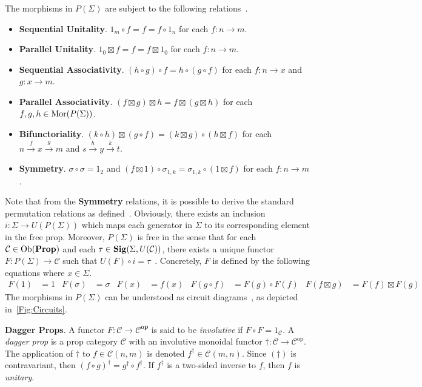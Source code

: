 The morphisms in $P( \Sigma )$ are subject to the following relations~\cite{Clement2023}.
\begin{itemize}
\item \textbf{Sequential Unitality}.
      $1_m \circ f = f = f \circ 1_n$ for each $f: n \to m$.
\item \textbf{Parallel Unitality}.
      $1_0 \boxtimes f = f = f \boxtimes 1_0$ for each $f: n \to m$.
\item \textbf{Sequential Associativity}.
      $( h \circ g ) \circ f = h \circ ( g \circ f )$ for each $f: n \to x$ and $g: x \to m$.
\item \textbf{Parallel Associativity}.
      $( f \boxtimes g ) \boxtimes h = f \boxtimes ( g \boxtimes h )$ for each $f, g, h \in \operatorname{Mor}( P( \Sigma ) )$.
\item \textbf{Bifunctoriality}.
      $( k \circ h ) \boxtimes ( g \circ f ) = ( k \boxtimes g ) \circ ( h \boxtimes f )$ for each $n \xrightarrow{f} x \xrightarrow{g} m$ and $s \xrightarrow{h} y \xrightarrow{k} t$. 
\item \textbf{Symmetry}.
      $\sigma \circ \sigma = 1_2$ and $( f \boxtimes 1 ) \circ \sigma_{1,k} = \sigma_{1,k} \circ ( 1 \boxtimes f )$ for each $f: n \to m$.
\end{itemize}
Note that from the \textbf{Symmetry} relations, it is possible to derive the standard permutation relations as defined~\cite{Lafont2003}.
Obviously, there exists an inclusion $i: \Sigma \to U( P( \Sigma ) )$ which maps each generator in $\Sigma$ to its corresponding element in the free prop.
Moreover, $P( \Sigma )$ is free in the sense that for each $\mathcal{C} \in \operatorname{Ob}( \mathbf{Prop} )$ and each $\tau \in \mathbf{Sig}( \Sigma, U( \mathcal{C} ) )$, there exists a unique functor $F: P( \Sigma ) \to \mathcal{C}$ such that $U( F ) \circ i = \tau$~\cite{Clerc2015}.
Concretely, $F$ is defined by the following equations where $x \in \Sigma$.
\begin{align*}
    F( 1 ) &= 1
    &
    F( \sigma ) &= \sigma
    &
    F( x ) &= f( x )
    &
    F( g \circ f ) &= F( g ) \circ F( f )
    &
    F( f \boxtimes g ) &= F( f ) \boxtimes F( g )
\end{align*}
The morphisms in $P( \Sigma )$ can be understood as circuit diagrams~\cite{Hotz1965}, as depicted in~\cref{Fig:Circuits}.

\vspace{1em}
\noindent
\textbf{Dagger Props}.
%
A functor $F: \mathcal{C} \to \mathcal{C}^\textbf{op}$ is said to be \emph{involutive} if $F \circ F = 1_{\mathcal{C}}$.
A \emph{dagger prop} is a prop category $\mathcal{C}$ with an involutive monoidal functor $\dagger: \mathcal{C} \to \mathcal{C}^{\text{op}}$.
The application of $\dagger$ to $f \in \mathcal{C}( n, m )$ is denoted $f^\dagger \in \mathcal{C}( m, n )$.
Since $( \dagger )$ is contravariant, then $( f \circ g )^\dagger = g^\dagger \circ f^\dagger$.
If $f^\dagger$ is a two-sided inverse to $f$, then $f$ is \emph{unitary}.

